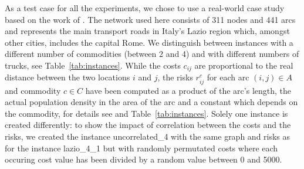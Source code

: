 \documentclass[preprint,12pt]{elsarticle}
\begin{document}
As a test case for all the experiments, we chose to use a real-world case study based on the work of \citet{bianco09}. The network used here consists of 311 nodes and 441 arcs and represents the main transport roads in Italy's Lazio region which, amongst other cities, includes the capital Rome. We distinguish between instances with a different number of commodities (between 2 and 4) and with different numbers of trucks, see Table~\ref{tab:instances}. While the costs $c_{ij}$ are proportional to the real distance between the two locations $i$ and $j$, the risks $r_{ij}^c$ for each arc $(i,j) \in A$ and commodity $c \in C$ have been computed as a product of the arc's length, the actual population density in the area of the arc and a constant which depends on the commodity, for details see \citep{bianco09} and Table~\ref{tab:instances}. Solely one instance is created differently: to show the impact of correlation between the costs and the risks, we created the instance uncorrelated\_4 with the same graph and risks as for the instance lazio\_4\_1 but with randomly permutated costs where each occuring cost value has been divided by a random value between 0 and 5000.
\end{document}
